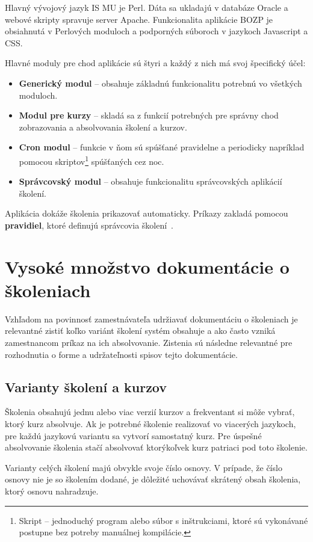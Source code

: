\documentclass[
  digital,     %
  oneside,     %
  nosansbold,  %
  nocolorbold, %
  lof,         %
  nolot,         %
]{fithesis4}
\begin{document}
\noindent
Hlavný vývojový jazyk IS MU je Perl. Dáta sa ukladajú v databáze Oracle a webové skripty spravuje server Apache. Funkcionalita aplikácie BOZP je obsiahnutá v Perlových moduloch a podporných súboroch v jazykoch Javascript a CSS.

Hlavné moduly pre chod aplikácie sú štyri a každý z nich má svoj špecifický účel:

\begin{itemize}
    \item \textbf{Generický modul} – obsahuje základnú funkcionalitu potrebnú vo všetkých moduloch.
    \item \textbf{Modul pre kurzy} – skladá sa z funkcií potrebných pre správny chod zobrazovania a absolvovania školení a kurzov.
    \item \textbf{Cron modul} – funkcie v ňom sú spúšťané pravidelne a periodicky napríklad pomocou skriptov\footnote{Skript -- jednoduchý program alebo súbor s inštrukciami, ktoré sú vykonávané postupne bez potreby manuálnej kompilácie.} spúšťaných cez noc.
    \item \textbf{Správcovský modul} – obsahuje funkcionalitu správcovských aplikácií školení.
\end{itemize}

\noindent
Aplikácia dokáže školenia prikazovať automaticky. Príkazy zakladá pomocou \textbf{pravidiel}, ktoré definujú správcovia školení~\cite[15]{kandova2019}.

\section{Vysoké množstvo dokumentácie o školeniach}
Vzhľadom na povinnosť zamestnávateľa udržiavať dokumentáciu o školeniach je relevantné zistiť koľko variánt školení systém obsahuje a ako často vzniká zamestnancom príkaz na ich absolvovanie. Zistenia sú následne relevantné pre rozhodnutia o forme a udržateľnosti spisov tejto dokumentácie.

\subsection*{Varianty školení a kurzov}
Školenia obsahujú jednu alebo viac verzií kurzov a frekventant si môže vybrať, ktorý kurz absolvuje. Ak je potrebné školenie realizovať vo viacerých jazykoch, pre každú jazykovú variantu sa vytvorí samostatný kurz. Pre úspešné absolvovanie školenia stačí absolvovať ktorýkoľvek kurz patriaci pod toto školenie.

Varianty celých školení majú obvykle svoje číslo osnovy. V prípade, že číslo osnovy nie je so školením dodané, je dôležité uchovávať skrátený obsah školenia, ktorý osnovu nahradzuje.
\end{document}
